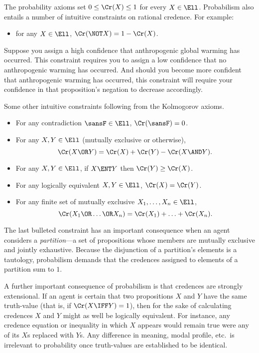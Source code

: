 The probability axioms set $0 \le \Cr(X) \le 1$ for every $X \in \Ell$. Probabilism also entails a number of intuitive constraints on rational credence. For example:
\begin{itemize}
\item{for any $X \in \Ell$, $\Cr(\NOT X)=1-\Cr(X)$.}
\end{itemize}
Suppose you assign a high confidence that anthropogenic global warming has occurred. This constraint requires you to assign a low confidence that no anthropogenic warming has occurred. And should you become more confident that anthropogenic warming has occurred, this constraint will require your confidence in that proposition's negation to decrease accordingly.

Some other intuitive constraints following from the Kolmogorov axioms.
\begin{itemize}
\item For any contradiction $\sansF \in \Ell$, $\Cr(\sansF)=0$.
\item For any $X, Y \in \Ell$ (mutually exclusive or otherwise), $$\Cr(X \OR Y)=\Cr(X) + \Cr(Y) - \Cr(X \AND Y).$$
\item For any $X, Y \in \Ell$, if $X \ENT Y$ then $\Cr(Y) \ge \Cr(X)$.
\item For any logically equivalent $X, Y \in \Ell$, $\Cr(X)=\Cr(Y)$.
\item For any finite set of mutually exclusive $X_1, \ldots, X_n \in \Ell$, $$\Cr(X_1 \OR \ldots \OR X_n)=\Cr(X_1)+\ldots+\Cr(X_n).$$
\end{itemize}
The last bulleted constraint has an important consequence when an agent considers a \textit{partition}---a set of propositions whose members are mutually exclusive and jointly exhaustive. Because the disjunction of a partition's elements is a tautology, probabilism demands that the credences assigned to elements of a partition sum to $1$.
 
A further important consequence of probabilism is that credences are strongly extensional. If an agent is certain that two propositions $X$ and $Y$ have the same truth-value (that is, if $\Cr(X \IFF Y)=1$), then for the sake of calculating credences $X$ and $Y$ might as well be logically equivalent. For instance, any credence equation or inequality in which $X$ appears would remain true were any of its $X$s replaced with $Y$s. Any difference in meaning, modal profile, etc.\ is irrelevant to probability once truth-values are established to be identical.

